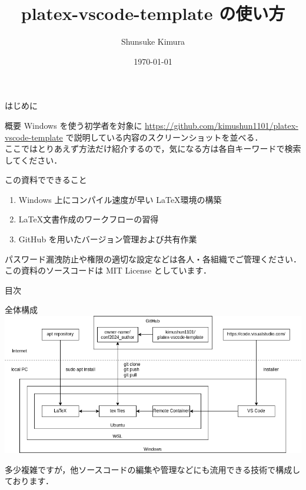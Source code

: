 \documentclass[aspectratio=169,dvipdfmx,cjk]{beamer}
\title{platex-vscode-template の使い方}
\author{Shunsuke Kimura}
\date{\today}
\begin{document}
\begin{frame}
  \titlepage
\end{frame}

\begin{frame}{はじめに}
  \begin{block}{概要}
    Windows を使う初学者を対象に \href{https://github.com/kimushun1101/platex-vscode-template}{https://github.com/kimushun1101/platex-vscode-template} で説明している内容のスクリーンショットを並べる．\\
    ここではとりあえず方法だけ紹介するので，気になる方は各自キーワードで検索してください．
  \end{block}
  \begin{block}{この資料でできること}
    \begin{enumerate}
      \item Windows 上にコンパイル速度が早い \LaTeX 環境の構築
      \item \LaTeX 文書作成のワークフローの習得
      \item GitHub を用いたバージョン管理および共有作業
    \end{enumerate}
  \end{block}
  \begin{tiny}
    パスワード漏洩防止や権限の適切な設定などは各人・各組織でご管理ください．
    この資料のソースコードは MIT License としています．
  \end{tiny}
\end{frame}

\begin{frame}{目次}
  \tableofcontents
\end{frame}

\begin{frame}{全体構成}
  \centering
  \includegraphics[width=0.9\linewidth]{fig/structure.png}
  \begin{tiny}
  \end{tiny}
  多少複雑ですが，他ソースコードの編集や管理などにも流用できる技術で構成しております．
\end{frame}
\end{document}
